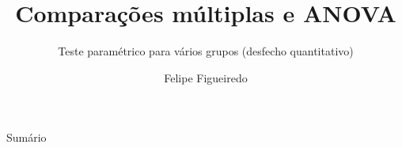 \documentclass{beamer}
\title%
{Comparações múltiplas e ANOVA}
\subtitle
{\small Teste paramétrico para vários grupos (desfecho quantitativo)} %
\author%
{Felipe Figueiredo}%
\institute[INTO] %
{Instituto Nacional de Traumatologia e Ortopedia
}
\date%
{}
\begin{document}
\begin{frame}
  \titlepage
\end{frame}

\begin{frame}{Sumário}
  \tableofcontents
\end{frame}








\end{document}
